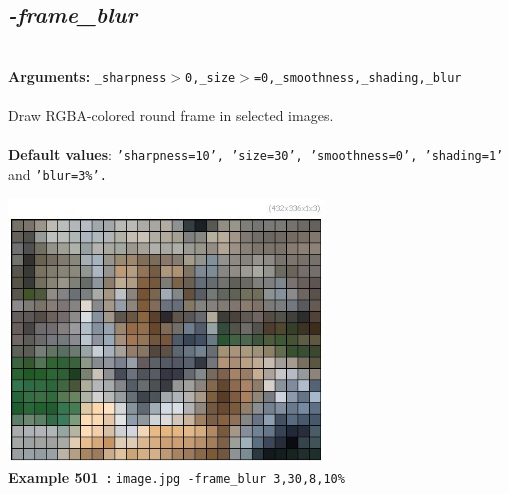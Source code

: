 \documentclass[a4paper,11pt,twoside]{book}
\begin{document}
\subsection{\emph{-frame\_blur} }\vspace*{-0.5em}
~\\\textbf{Arguments: } 
{\small \texttt{\_sharpness$>$0,\_size$>$=0,\_smoothness,\_shading,\_blur}}\\~\\
Draw RGBA-colored round frame in selected images.
~\\~\\\textbf{Default values}: {\small \texttt{'sharpness=10', 'size=30', 'smoothness=0', 'shading=1'} and \texttt{'blur=3\%'.}}
\begin{center}\includegraphics[keepaspectratio=true,height=7cm,width=\textwidth]{img/gmic_def501.jpg}\\
{\footnotesize \textbf{Example 501~:} \texttt{image.jpg -frame\_blur 3,30,8,10\%}}
\end{center}
\end{document}
